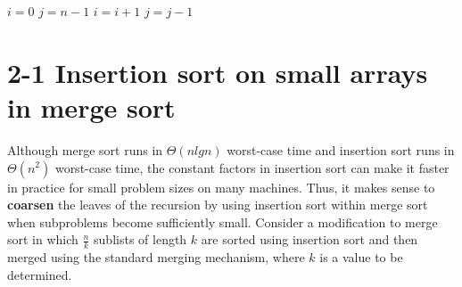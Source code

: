 \documentclass[a4paper, 11pt, UTF8]{article}
\begin{document}
\begin{algorithm}
    \begin{algorithmic}[1]
        \State {}
        \State $i = 0$ 
        \State $j = n-1$
                \State {}
            \EndIf
                \State $i = i + 1$
            \EndIf
                \State $j = j - 1$
            \EndIf
        \EndWhile
        \State {}
    \EndFunction
    \end{algorithmic}
\end{algorithm}


\section*{2-1 Insertion sort on small arrays in merge sort}
Although merge sort runs in $\Theta(nlgn)$ worst-case time and insertion sort
runs in $\Theta(n^2)$ worst-case time, the constant factors in insertion sort 
can make it faster in practice for small problem sizes on many machines. Thus,
it makes sense to \textbf{coarsen} the leaves of the recursion by using 
insertion sort within merge sort when subproblems become sufficiently small.
Consider a modification to merge sort in which $\frac{n}{k}$ sublists of length 
$k$ are sorted using insertion sort and then merged using the standard merging
mechanism, where $k$ is a value to be determined.
\end{document}
